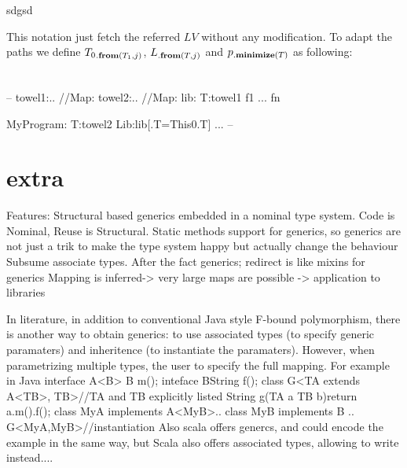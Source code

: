 sdgsd

\noindent\begin{defye}%
%
%
%
%
%
\end{defye}


This notation just fetch the referred $LV$ without any modification.
To adapt the paths we define $T_0{{}_{.\textbf{from}({T_1,j})}}$, $L{{}_{.\textbf{from}({T,j})}}$ and $p{{}_{.\textbf{minimize}({T})}}$ as following:
\begin{defye}%
\end{defye}
\\${}_{}$\\






--
towel1:.. //{Map:{} }
towel2:.. //{Map:{} }
lib:{
  T:towel1
  f1
  ...
  fn
  }

MyProgram:{
  T:towel2
  Lib:lib[.T=This0.T]
  ...
  }
-- 
\section{extra}

Features:
Structural based generics embedded in a nominal type system.
Code is Nominal, Reuse is Structural.
Static methods support for generics, so generics are not just a trik to make the type system happy but actually
change the behaviour
Subsume associate types.
After the fact generics; redirect is like mixins for generics
Mapping is inferred-> very large maps are possible -> application to libraries


In literature, in addition to conventional Java style F-bound polymorphism, there is
another way to obtain generics: to use associated types (to specify generic paramaters) and inheritence (to instantiate the paramaters).
However, when parametrizing multiple types, the user to specify the full mapping.
For example in Java
    interface A<B>{ B m(); }
    inteface B{String f();}
    class G<TA extends A<TB>, TB>{//TA and TB explicitly listed
      String g(TA a TB b){return a.m().f();}
    }
    class MyA implements A<MyB>{..}
    class MyB implements B {..}
    G<MyA,MyB>//instantiation
Also scala offers genercs, and could encode the example in the same way, but Scala
also offers associated types, allowing to write instead....

